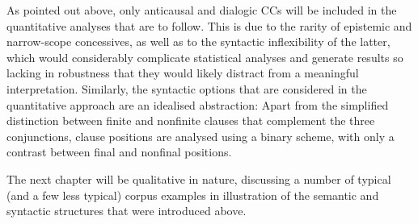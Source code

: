 As pointed out above, only anticausal and dialogic CCs will be included in the quantitative analyses that are to follow. This is due to the rarity of epistemic and narrow-scope concessives, as well as to the syntactic inflexibility of the latter, which would considerably complicate statistical analyses and generate results so lacking in robustness that they would likely distract from a meaningful interpretation. Similarly, the syntactic options that are considered in the quantitative approach are an idealised abstraction: Apart from the simplified distinction between finite and nonfinite clauses that complement the three conjunctions, clause positions are analysed using a binary scheme, with only a contrast between final and nonfinal positions.

The next chapter will be qualitative in nature, discussing a number of typical (and a few less typical) corpus examples in illustration of the semantic and syntactic structures that were introduced above.
